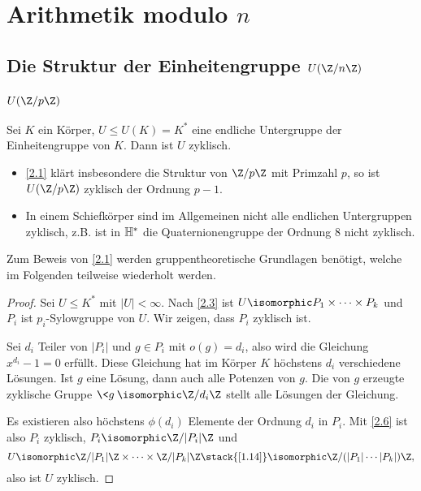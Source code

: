\chapter{Arithmetik modulo \texorpdfstring{$n$}{n}}



\section{Die Struktur der Einheitengruppe \texorpdfstring{$U(\Z / n\Z)$}{U(ℤ/nℤ)}}


\subsection{\texorpdfstring{$U(\Z / p\Z)$}{U(ℤ/pℤ)}}


\begin{st} \label{2.1}
	Sei $K$ ein Körper, $U \le U(K) = K^*$ eine endliche Untergruppe der Einheitengruppe von $K$.
	Dann ist $U$ zyklisch.
	\begin{note}
		\begin{itemize}
			\item
				\ref{2.1} klärt insbesondere die Struktur von $\Z / p\Z$ mit Primzahl $p$, so ist $U(\Z / p\Z)$ zyklisch der Ordnung $p - 1$.
			\item
				In einem Schiefkörper sind im Allgemeinen nicht alle endlichen Untergruppen zyklisch, z.B. ist in $\mathbb{H}^*$ die Quaternionengruppe der Ordnung $8$ nicht zyklisch.
		\end{itemize}
		Zum Beweis von \ref{2.1} werden gruppentheoretische Grundlagen benötigt, welche im Folgenden teilweise wiederholt werden.
	\end{note}
	\begin{proof}
		Sei $U \le K^*$ mit $|U| < \infty$.
		Nach \ref{2.3} ist $U \isomorphic P_1 \times \dotsb \times P_k$ und $P_i$ ist $p_i$-Sylowgruppe von $U$.
		Wir zeigen, dass $P_i$ zyklisch ist.

		Sei $d_i$ Teiler von $|P_i|$ und $g \in P_i$ mit $o(g) = d_i$, also wird die Gleichung $x^{d_i} - 1 = 0$ erfüllt.
		Diese Gleichung hat im Körper $K$ höchstens $d_i$ verschiedene Lösungen.
		Ist $g$ eine Lösung, dann auch alle Potenzen von $g$.
		Die von $g$ erzeugte zyklische Gruppe $\<g\> \isomorphic \Z / d_i \Z$ stellt alle Lösungen der Gleichung.

		Es existieren also höchstens $\phi(d_i)$ Elemente der Ordnung $d_i$ in $P_i$.
		Mit \ref{2.6} ist also $P_i$ zyklisch, $P_i \isomorphic \Z / |P_i| \Z$ und
		\[
			U \isomorphic
			\Z / |P_1| \Z \times \dotsb \times \Z / |P_k| \Z
			\stack{\ref{1.14}}\isomorphic
			\Z / (|P_1| \dotsb |P_k|) \Z,
		\]
		also ist $U$ zyklisch.
	\end{proof}
\end{st}

